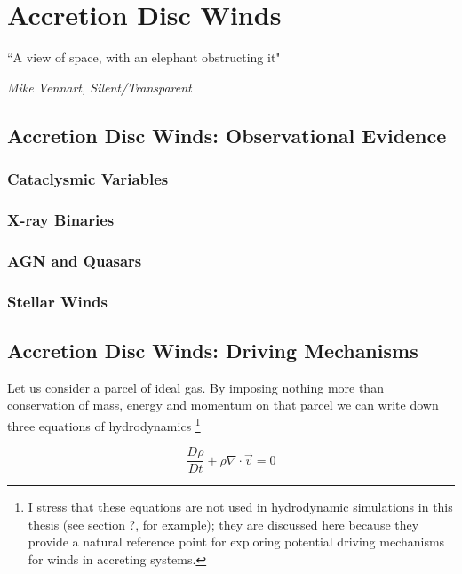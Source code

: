 \chapter{Accretion Disc Winds}
\label{sec:winds}

\epigraph{``A view of space, with an elephant obstructing it"}
{{\sl Mike Vennart, Silent/Transparent}}


\section{Accretion Disc Winds: Observational Evidence}

\subsection{Cataclysmic Variables}

\subsection{X-ray Binaries}
\label{sec:xrb_winds}


\subsection{AGN and Quasars}

\subsection{Stellar Winds}

\section{Accretion Disc Winds: Driving Mechanisms}

Let us consider a parcel of ideal gas. By imposing nothing more than
conservation of mass, energy and momentum on that parcel we can write down
three equations of hydrodynamics
\footnote{I stress that these equations are not used in hydrodynamic
simulations in this thesis (see section ?, for example); 
they are discussed here because they provide a natural reference point
for exploring potential driving mechanisms for winds in accreting systems.
}

\begin{equation}
\label{eq:continuity}
\frac{D \rho}{Dt} + \rho \nabla \cdot \vec{v} = 0
\end{equation}

